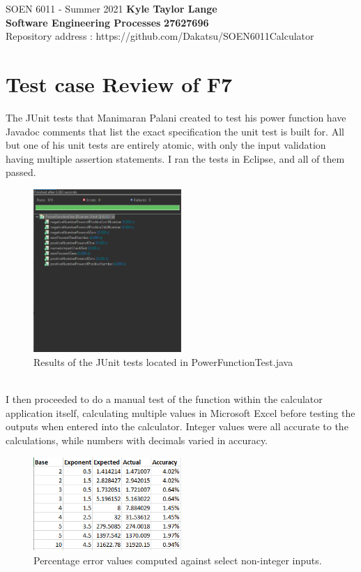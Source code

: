 \documentclass[letterpaper, 11pt]{report}
\begin{document}
\section*{}
\normalsize {SOEN 6011 - Summer 2021} \hfill \textbf{Kyle Taylor Lange} \\
\textbf{ Software Engineering Processes}  \hfill \textbf{27627696} \\
\hfill Repository address : https://github.com/Dakatsu/SOEN6011Calculator
\\

\section*{Test case Review of F7}
The JUnit tests that Manimaran Palani created to test his power function have Javadoc comments that list the exact specification the unit test is built for. All but one of his unit tests are entirely atomic, with only the input validation having multiple assertion statements. I ran the tests in Eclipse, and all of them passed. \\
\begin{figure}[htb]
\includegraphics[width=0.5\textwidth]{TestF7}
\centering
\caption{Results of the JUnit tests located in PowerFunctionTest.java}
\end{figure} \\
\pagebreak
I then proceeded to do a manual test of the function within the calculator application itself, calculating multiple values in Microsoft Excel before testing the outputs when entered into the calculator. Integer values were all accurate to the calculations, while numbers with decimals varied in accuracy. \\
\begin{figure}[htb]
\includegraphics[width=0.5\textwidth]{ErrorF7}
\centering
\caption{Percentage error values computed against select non-integer inputs.}
\end{figure} \\\\
\end{document}

